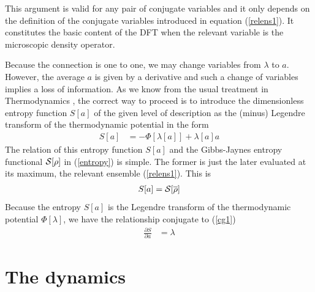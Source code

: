 \documentclass[b5paper,openright,10pt]{book}
\begin{document}
This argument is  valid for  any pair  of conjugate variables  and it
only depends on  the definition of the  conjugate variables introduced
in equation (\ref{relens1}).  It constitutes  the basic content of the DFT
when the relevant variable is the microscopic density operator.

Because the  connection is one  to one,  we may change  variables from
$\lambda$ to $a$.   However, the average $a$ is given  by a derivative
and such a  change of variables implies a loss  of information.  As we
know from the usual treatment in Thermodynamics \cite{Callen1960}, the
correct way to proceed is to  introduce the dimensionless entropy function $S[a]$ of
the given  level of description  as the (minus) Legendre  transform of
the thermodynamic potential in the form
\begin{align}
S[a] &=-\Phi[\lambda[a]]+\lambda[a] a
\label{entropya}\end{align}
The  relation of  this entropy  function $S[a]$  and the  Gibbs-Jaynes
entropy functional  ${\cal S}[\rho]$ in  (\ref{entropy}) is
simple. The  former is just  the later  evaluated at its  maximum, the
relevant ensemble (\ref{relens1}). This is
\begin{align}
S[a]={\cal  S}[\overline{\rho}]
\end{align}
Because  the  entropy   $S[a]$  is  the  Legendre   transform  of  the
thermodynamic  potential  $\Phi[\lambda]$,  we have  the  relationship
conjugate to (\ref{cg1})
\begin{align}
  \frac{\partial S}{\partial a}&=\lambda
\label{e3}
\end{align}


\section{The dynamics}\label{Sec:Grabert}
\end{document}
